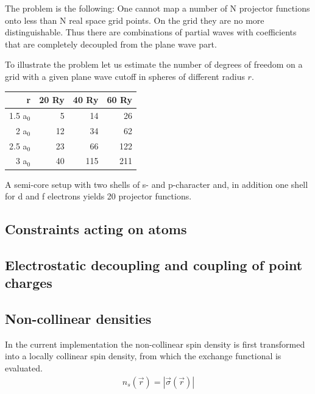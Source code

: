 \documentclass[final,12pt,makeidx,DIV=calc]{article}
\begin{document}
{{{{{{The problem is the following: One cannot map a number of N projector
functions onto less than N real space grid points. On the grid they
are no more distinguishable. Thus there are combinations of partial
waves with coefficients that are completely decoupled from the plane
wave part. 

To illustrate the problem let us estimate the number of degrees of
freedom on a grid with a given plane wave cutoff in spheres of
different radius $r$.

\begin{center}
\begin{tabular}{|r|r|r|r|}
\hline
r      & 20 Ry & 40 Ry & 60 Ry \\
\hline
1.5 a$_0$ &  5 &  14 &  26 \\
2   a$_0$& 12 &  34 &  62 \\
2.5 a$_0$& 23 &  66 &  122\\
3   a$_0$& 40 & 115 & 211 \\
\hline
\end{tabular}
\end{center}

A semi-core setup with two shells of s- and p-character and, in
addition one shell for d and f electrons yields 20 projector
functions.




\subsection{Constraints acting on atoms}


\subsection{Electrostatic decoupling and coupling of point charges}

\subsection{Non-collinear densities}
\label{sec:noncollinear}
In the current implementation the non-collinear spin density is first
transformed into a locally collinear spin density, from which the
exchange functional is evaluated. 
\begin{eqnarray*}
n_s(\vec{r})= |\vec{\sigma}(\vec{r})|
\end{eqnarray*}

}}}}}}
\end{document}
